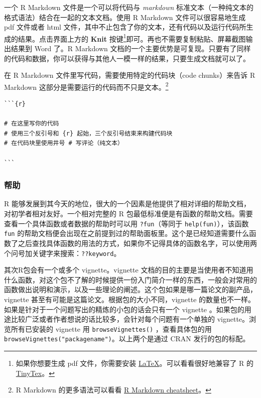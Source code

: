 \documentclass[]{ctexbook}
\newcommand{\passthrough}[1]{#1}
\begin{document}
一个 R Markdown 文件是一个可以将代码与 \emph{markdown} 标准文本（一种纯文本的格式语法）结合在一起的文本文档。使用 R Markdown 文件可以很容易地生成 pdf 文件或者 html 文件，其中不止包含了你的文本，还有代码以及运行代码所生成的结果。点击界面上方的 \textbf{Knit} 按键\footnote{如果你想要生成 pdf 文件，你需要安装 \href{https://www.latex-project.org/}{LaTeX}。可以看看很好地兼容了 R 的\href{https://yihui.org/tinytex/}{TinyTex}。}即可。再也不需要复制粘贴、屏幕截图输出结果到 Word 了。R Markdown 文档的一个主要优势是可复现。只要有了同样的代码和数据，你可以获得与其他人一模一样的结果，只要生成文档就可以了。

在 R Markdown 文件里写代码，需要使用特定的代码块（code chunks）来告诉 R Markdown 这部分是需要运行的代码而不只是文本。\footnote{R Markdown 的更多语法可以看看 \href{https://rstudio.com/wp-content/uploads/2016/03/rmarkdown-cheatsheet-2.0.pdf}{R Markdown cheatsheet}。}

\begin{lstlisting}
```{r}

# 在这里写你的代码
# 使用三个反引号和 {r} 起始，三个反引号结束来构建代码块
# 在代码块里使用井号 # 写评论（纯文本） 

```
\end{lstlisting}

\hypertarget{ux5e2eux52a9}{%
\subsubsection{帮助}\label{ux5e2eux52a9}}

R 能够发展到其今天的地位，很大的一个因素是他提供了相对详细的帮助文档，对初学者相对友好。一个相对完整的 R 包最低标准便是有函数的帮助文档。需要查看一个具体函数或者数据的帮助时可以用 \passthrough{\lstinline!?fun!}（等同于 \passthrough{\lstinline!help(fun)!}），该函数 \passthrough{\lstinline!fun!} 的帮助文档便会出现在之前提到过的帮助面板里。这个是已经知道需要什么函数了之后查找具体函数的用法的方式，如果你不记得具体的函数名字，可以使用两个问号加关键字来搜索：\passthrough{\lstinline!??keyword!}。

其次R包会有一个或多个 vignette。vignette 文档的目的主要是当使用者不知道用什么函数，对这个包不了解的时候提供一份入门简介一样的东西，一般会对常用的函数做出说明和演示，以及一些理论的阐述。这个包如果是哪一篇论文的副产品，vignette 甚至有可能是这篇论文。根据包的大小不同，vignette 的数量也不一样。如果是针对于一个问题写出的精炼的小包的话会只有一个 vignette 。如果包的用途比较广泛或者作者想说的话比较多，会针对每个问题有一个单独的 vignette。浏览所有已安装的 vignette 用 \passthrough{\lstinline!browseVignettes()!} ，查看具体包的用\passthrough{\lstinline!browseVignettes("packagename")!}。以上两个是通过 CRAN 发行的包的标配。
\end{document}
